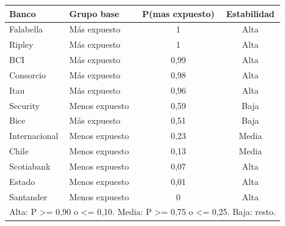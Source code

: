\begin{center}
\scriptsize
\renewcommand{\arraystretch}{1.1}
\begin{tabular}{llcc}
\hline
Banco & Grupo base & P(mas expuesto) & Estabilidad \\
\hline\hline
Falabella & Más expuesto & 1 & Alta \\
Ripley & Más expuesto & 1 & Alta \\
BCI & Más expuesto & 0,99 & Alta \\
Consorcio & Más expuesto & 0,98 & Alta \\
Itau & Más expuesto & 0,96 & Alta \\
Security & Menos expuesto & 0,59 & Baja \\
Bice & Más expuesto & 0,51 & Baja \\
Internacional & Menos expuesto & 0,23 & Media \\
Chile & Menos expuesto & 0,13 & Media \\
Scotiabank & Menos expuesto & 0,07 & Alta \\
Estado & Menos expuesto & 0,01 & Alta \\
Santander & Menos expuesto & 0 & Alta \\
\hline
\multicolumn{4}{l}{\tiny Alta: P >= 0,90 o <= 0,10. Media: P >= 0,75 o <= 0,25. Baja: resto.}\\
\end{tabular}
\end{center}

